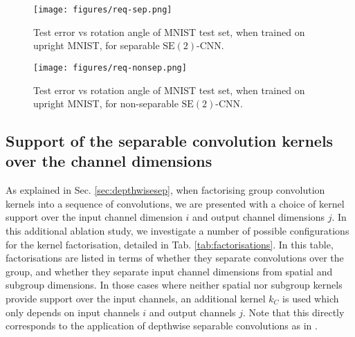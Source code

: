 \documentclass[nohyperref]{article}
\theoremstyle{plain}
\theoremstyle{definition}
\theoremstyle{remark}
\begin{document}
\begin{figure}
\centering
\begin{minipage}{.45\textwidth}
\centering
  \texttt{[image: figures/req-sep.png]}
  \captionsetup{width=.9\linewidth}
  \caption{Test error vs rotation angle of MNIST test set, when trained on upright MNIST, for separable $\mathrm{SE(2)}$-CNN.}
  \label{fig:mnistrot-equiv-eval-1}
\end{minipage}
\begin{minipage}{.45\textwidth}
\centering
  \texttt{[image: figures/req-nonsep.png]}
  \captionsetup{width=.9\linewidth}
  \caption{Test error vs rotation angle of MNIST test set, when trained on upright MNIST, for non-separable $\mathrm{SE(2)}$-CNN.}
  \label{fig:mnistrot-equiv-eval}
\end{minipage}
\end{figure}

\subsection{Support of the separable convolution kernels over the channel dimensions}
\label{app:gsep-vs-sep} As explained in Sec. \ref{sec:depthwisesep}, when factorising group convolution kernels into a sequence of convolutions, we are presented with a choice of kernel support over the input channel dimension $i$ and output channel dimensions $j$. In this additional ablation study, we investigate a number of possible configurations for the kernel factorisation, detailed in Tab. \ref{tab:factorisations}. In this table, factorisations are listed in terms of whether they separate convolutions over the group, and whether they separate input channel dimensions from spatial and subgroup dimensions. In those cases where neither spatial nor subgroup kernels provide support over the input channels, an additional kernel $k_C$ is used which only depends on input channels $i$ and output channels $j$. Note that this directly corresponds to the application of depthwise separable convolutions as in \citet{haase2020rethinking}.
\end{document}
